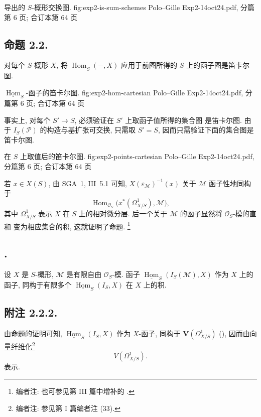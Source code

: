   {导出的 \(S\)-概形交换图.}
  {fig:exp2-is-sum-schemes}
  {Polo--Gille Exp2-14oct24.pdf, 分篇第 6 页; 合订本第 64 页}

\subsection*{命题 2.2.}
对每个 \(S\)-概形 \(X\), 将
\(\underline{\operatorname{Hom}}_S(-,X)\) 应用于前图所得的
\(S\) 上的函子图是笛卡尔图.

  {\(\underline{\operatorname{Hom}}_S\)-函子的笛卡尔图.}
  {fig:exp2-hom-cartesian}
  {Polo--Gille Exp2-14oct24.pdf, 分篇第 6 页; 合订本第 64 页}

事实上, 对每个 \(S'\to S\), 必须验证在 \(S'\) 上取函子值所得的集合图
是笛卡尔图. 由于 \(I_S(\mathcal P)\) 的构造与基扩张可交换,
只需取 \(S'=S\), 因而只需验证下面的集合图是笛卡尔图.

  {在 \(S\) 上取值后的笛卡尔图.}
  {fig:exp2-points-cartesian}
  {Polo--Gille Exp2-14oct24.pdf, 分篇第 6 页; 合订本第 64 页}

若 \(x\in X(S)\), 由 SGA~1, III~5.1 可知,
\(X(\varepsilon_{\mathcal M})^{-1}(x)\) 关于 \(\mathcal M\)
函子性地同构于
\[
  \operatorname{Hom}_{\mathcal O_S}
    \bigl(x^*(\Omega^1_{X/S}),\mathcal M\bigr),
\]
其中 \(\Omega^1_{X/S}\) 表示 \(X\) 在 \(S\) 上的相对微分层.
后一个关于 \(\mathcal M\) 的函子显然将 \(\mathcal O_S\)-模的直和
变为相应集合的积, 这就证明了命题.
\footnote{编者注: 也可参见第 III 篇中增补的
.}

\subsection*{.}
设 \(X\) 是 \(S\)-概形, \(\mathcal M\) 是有限自由
\(\mathcal O_S\)-模. 函子
\(\underline{\operatorname{Hom}}_S(I_S(\mathcal M),X)\) 作为
\(X\) 上的函子, 同构于有限多个
\(\underline{\operatorname{Hom}}_S(I_S,X)\) 在 \(X\) 上的积.

\subsection*{附注 2.2.2.}
由命题的证明可知,
\(\underline{\operatorname{Hom}}_S(I_S,X)\) 作为 \(X\)-函子,
同构于 \(\mathbf V(\Omega^1_{X/S})\) (),
因而由向量纤维化\footnote{编者注: 参见第 I 篇编者注 (33).}
\[
  V(\Omega^1_{X/S}).
\]
表示.


